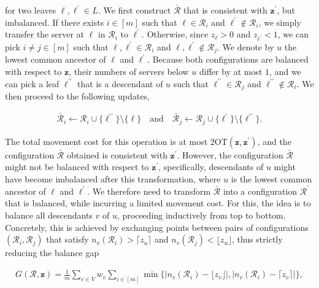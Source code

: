 for two leaves $\ell,\ell^{\prime}\in L$.
We first construct $\bar{\mathcal{R}}$ that is consistent with ${\mathbf{z}}^{\prime}$, but imbalanced.
If there exists $i\in[m]$ such that $\ell\in\mathcal{R}_{i}$ and $\ell^{\prime}\not\in\mathcal{R}_{i}$, we simply transfer the server at $\ell$ in $\mathcal{R}_{i}$ to $\ell^{\prime}$. Otherwise, since $z_{\ell}>0$ and $z_{\ell^{\prime}}<1$, we can pick $i\neq j\in[m]$ such that $\ell,\ell^{\prime}\in\mathcal{R}_{i}$ and $\ell,\ell^{\prime}\not\in\mathcal{R}_{j}$. We denote by $u$ the lowest common ancestor of $\ell$ and $\ell^{\prime}$. Because both configurations are balanced with respect to ${\mathbf{z}}$, their numbers of servers below $u$ differ by at most $1$, and we can pick a leaf $\ell^{\prime\prime}$ that is a descendant of $u$ such that $\ell^{\prime\prime}\in\mathcal{R}_{j}$ and $\ell^{\prime\prime}\not\in\mathcal{R}_{i}$. We then proceed to the following updates,\par


\[\begin{gathered}
\bar{\mathcal{R}}_{i}\leftarrow\mathcal{R}_{i}\cup\{\ell^{\prime\prime}\}\setminus\{\ell\}\quad\text{and}\quad\bar{\mathcal{R}}_{j}\leftarrow\mathcal{R}_{j}\cup\{\ell^{\prime}\}\setminus\{\ell^{\prime\prime}\}.
\end{gathered}\]


The total movement cost for this operation is at most $2\text{OT}({\mathbf{z}},{\mathbf{z}}^{\prime})$, and the configuration $\bar{\mathcal{R}}$ obtained is consistent with ${\mathbf{z}}^{\prime}$. However, the configuration $\bar{\mathcal{R}}$ might not be balanced with respect to ${\mathbf{z}}^{\prime}$, specifically, descendants of $u$ might have become imbalanced after this transformation, where $u$ is the lowest common ancestor of $\ell$ and $\ell^{\prime}$. We therefore need to transform $\bar{\mathcal{R}}$ into a configuration $\mathcal{R}^{\prime}$ that is balanced, while incurring a limited movement cost. For this, the idea is to balance all descendants $v$ of $u$, proceeding inductively from top to bottom. Concretely, this is achieved by exchanging points between pairs of configurations $(\mathcal{R}_{i},\mathcal{R}_{j})$ that satisfy $n_{v}(\mathcal{R}_{i})>{\lceil z_{u}\rceil}$ and $n_{v}(\mathcal{R}_{j})<{\lfloor z_{u}\rfloor}$, thus strictly reducing the balance gap\par


\[\begin{gathered}
G(\mathcal{R},{\mathbf{z}})=\frac{1}{m}\sum_{v\in V}w_{v}\sum_{i\in[m]}\min\{|n_{v}(\mathcal{R}_{i})-{\lfloor z_{v}\rfloor}|,|n_{v}(\mathcal{R}_{i})-{\lceil
z_{v}\rceil}|\},
\end{gathered}\]


